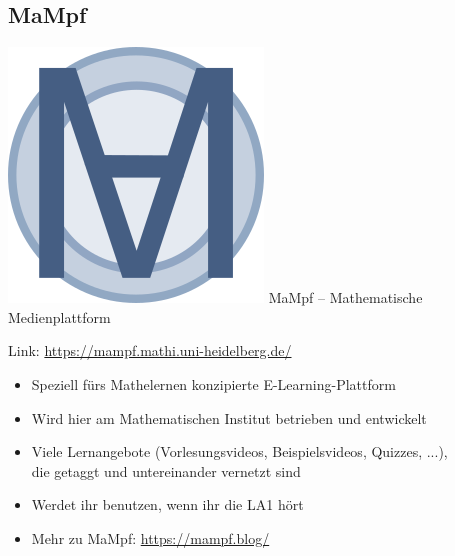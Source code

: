 \subsection{MaMpf}
\begin{frame}{\includegraphics[scale=0.072]{images/mampf.png} MaMpf -- Mathematische Medienplattform}

    Link: \url{https://mampf.mathi.uni-heidelberg.de/}

    \begin{center}
    \end{center}

    \begin{itemize}
        \item Speziell fürs Mathelernen konzipierte E-Learning-Plattform
        \item Wird hier am Mathematischen Institut betrieben und entwickelt
        \item Viele Lernangebote (Vorlesungsvideos, Beispielsvideos, Quizzes, ...),\\
              die getaggt und untereinander vernetzt sind
        \item Werdet ihr benutzen, wenn ihr die LA1 hört
        \item Mehr zu MaMpf: \url{https://mampf.blog/}
    \end{itemize}

\end{frame}

